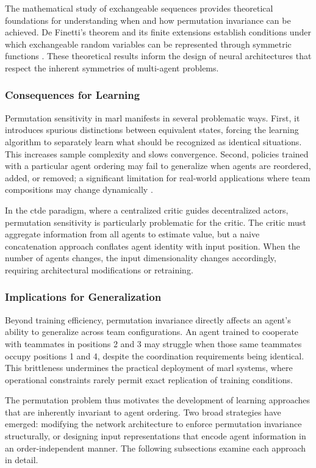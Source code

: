 The mathematical study of exchangeable sequences provides theoretical
foundations for understanding when and how permutation invariance
can be achieved. De Finetti's theorem and its finite extensions
establish conditions under which exchangeable random variables
can be represented through symmetric functions \cite{diaconis1980}.
These theoretical results inform the design of neural architectures
that respect the inherent symmetries of multi-agent problems.

\subsubsection{Consequences for Learning}

Permutation sensitivity in \gls{marl} manifests in several
problematic ways. First, it introduces spurious distinctions
between equivalent states, forcing the learning algorithm to
separately learn what should be recognized as identical situations.
This increases sample complexity and slows convergence. Second,
policies trained with a particular agent ordering may fail to
generalize when agents are reordered, added, or removed; a
significant limitation for real-world applications where team
compositions may change dynamically \cite{kimura2024}.

In the \gls{ctde} paradigm, where a centralized critic guides
decentralized actors, permutation sensitivity is particularly
problematic for the critic. The critic must aggregate information
from all agents to estimate value, but a naive concatenation
approach conflates agent identity with input position. When the
number of agents changes, the input dimensionality changes
accordingly, requiring architectural modifications or retraining.

\subsubsection{Implications for Generalization}

Beyond training efficiency, permutation invariance directly
affects an agent's ability to generalize across team configurations.
An agent trained to cooperate with teammates in positions 2 and 3
may struggle when those same teammates occupy positions 1 and 4,
despite the coordination requirements being identical. This
brittleness undermines the practical deployment of \gls{marl}
systems, where operational constraints rarely permit exact
replication of training conditions.

The permutation problem thus motivates the development of
learning approaches that are inherently invariant to agent
ordering. Two broad strategies have emerged: modifying the
network architecture to enforce permutation invariance
structurally, or designing input representations that encode
agent information in an order-independent manner. The following
subsections examine each approach in detail.

